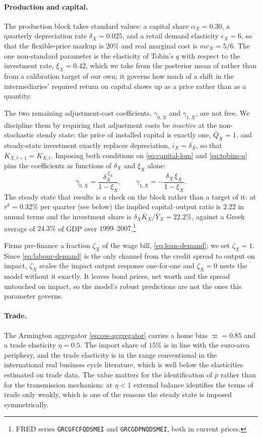 \paragraph{Production and capital.}
The production block takes standard values: a capital share $\alpha_X=0.30$, a
quarterly depreciation rate $\delta_X=0.025$, and a retail demand elasticity
$\epsilon_X=6$, so that the flexible-price markup is $20\%$ and real marginal
cost is $mc_X=5/6$. The one non-standard parameter is the elasticity of Tobin's
$q$ with respect to the investment rate, $\xi_X=0.42$, which we take from the
posterior mean of \citet{bocola2016pass} rather than from a calibration target of
our own; it governs how much of a shift in the intermediaries' required return on
capital shows up as a price rather than as a quantity.

The two remaining adjustment-cost coefficients, $\gamma_{0,X}$ and
$\gamma_{1,X}$, are not free. We discipline them by requiring that adjustment
costs be \emph{inactive} at the non-stochastic steady state: the price of
installed capital is exactly one, $\bar Q_X=1$, and steady-state investment
exactly replaces depreciation, $\bar\iota_X=\delta_X$, so that
$K_{X,t+1}=K_{X,t}$. Imposing both conditions on \eqref{eq:capital-lom} and
\eqref{eq:tobins-q} pins the coefficients as functions of $\delta_X$ and $\xi_X$
alone:
\begin{equation}
\gamma_{0,X}=\frac{\delta_X^{\;\xi_X}}{1-\xi_X},
\qquad
\gamma_{1,X}=-\frac{\delta_X\,\xi_X}{1-\xi_X}.
\label{eq:jermann-coeffs}
\end{equation}
The steady state that results is a check on the block rather than a target of it:
at $\bar r^{k}=0.32\%$ per quarter (see below) the implied capital--output ratio
is $2.22$ in annual terms and the investment share is
$\delta_X\bar K_X/\bar Y_X=22.2\%$, against a Greek average of $24.3\%$ of GDP
over $1999$--$2007$.\footnote{FRED series \texttt{GRCGFCFQDSMEI} and
\texttt{GRCGDPNQDSMEI}, both in current prices.}

Firms pre-finance a fraction $\zeta_X$ of the wage bill, \eqref{eq:loan-demand};
we set $\zeta_X=1$. Since \eqref{eq:labour-demand} is the only channel from the
credit spread to output on impact, $\zeta_X$ scales the impact output response
one-for-one and $\zeta_X=0$ nests the model without it exactly. It leaves bond
prices, net worth and the spread untouched on impact, so the model's robust
predictions are not the ones this parameter governs.

\paragraph{Trade.}
The Armington aggregator \eqref{eq:ces-aggregator} carries a home bias
$\varpi=0.85$ and a trade elasticity $\eta=0.5$. The import share of $15\%$ is in
line with the euro-area periphery, and the trade elasticity is in the range
conventional in the international real business cycle literature, which is well
below the elasticities estimated on trade data. The value matters for the
identification of $p$ rather than for the transmission mechanism: at $\eta<1$
external balance identifies the terms of trade only weakly, which is one of the
reasons the steady state is imposed symmetrically.

